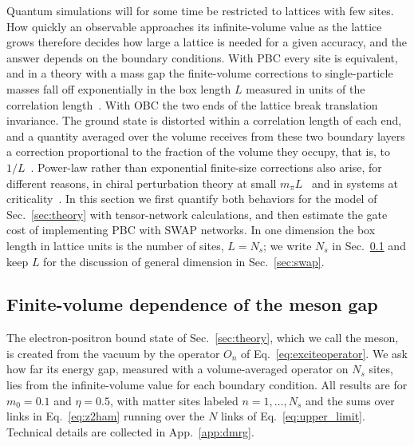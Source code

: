 \documentclass[twocolumn,superscriptaddress,showpacs,nofootinbib,notitlepage,preprintnumbers,secnumarabic,amssymb, floatfix, nobibnotes, aps, prd]{revtex4-2}
\begin{document}
Quantum simulations will for some time be restricted to lattices with few sites.
How quickly an observable approaches its infinite-volume value as the lattice grows therefore decides how large a lattice is needed for a given accuracy, and the answer depends on the boundary conditions.
With PBC every site is equivalent, and in a theory with a mass gap the finite-volume corrections to single-particle masses fall off exponentially in the box length $L$ measured in units of the correlation length~\cite{Luscher:1985dn,Luscher:1986pf}.
With OBC the two ends of the lattice break translation invariance.
The ground state is distorted within a correlation length of each end, and a quantity averaged over the volume receives from these two boundary layers a correction proportional to the fraction of the volume they occupy, that is, to $1/L$~\cite{Symanzik:1981wd}.
Power-law rather than exponential finite-size corrections also arise, for different reasons, in chiral perturbation theory at small $m_\pi L$~\cite{Hasenfratz:1989pk} and in systems at criticality~\cite{Cardy:1984bb}.
In this section we first quantify both behaviors for the model of Sec.~\ref{sec:theory} with tensor-network calculations, and then estimate the gate cost of implementing PBC with SWAP networks.
In one dimension the box length in lattice units is the number of sites, $L=N_s$; we write $N_s$ in Sec.~\ref{sec:mass_gap_L} and keep $L$ for the discussion of general dimension in Sec.~\ref{sec:swap}.

\subsection{Finite-volume dependence of the meson gap}
\label{sec:mass_gap_L}

The electron-positron bound state of Sec.~\ref{sec:theory}, which we call the meson, is created from the vacuum by the operator $O_n$ of Eq.~\eqref{eq:exciteoperator}.
We ask how far its energy gap, measured with a volume-averaged operator on $N_s$ sites, lies from the infinite-volume value for each boundary condition.
All results are for $m_0=0.1$ and $\eta=0.5$, with matter sites labeled $n=1,\dots,N_s$ and the sums over links in Eq.~\eqref{eq:z2ham} running over the $N$ links of Eq.~\eqref{eq:upper_limit}.
Technical details are collected in App.~\ref{app:dmrg}.
\end{document}
